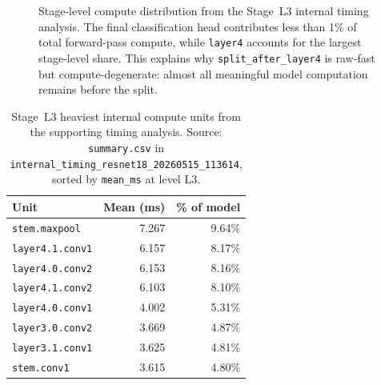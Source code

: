 \begin{figure}[t]
{%
}
\caption[Stage-level compute distribution (Stage~L3)]{Stage-level compute distribution from the Stage~L3 internal timing analysis. The final classification head contributes less than 1\% of total forward-pass compute, while \texttt{layer4} accounts for the largest stage-level share. This explains why \texttt{split\_after\_layer4} is raw-fast but compute-degenerate: almost all meaningful model computation remains before the split.}
\label{fig:rq13-stage-compute-distribution}
\end{figure}

\begin{table}[t]
\centering
\caption[Stage~L3 heaviest internal compute units]{Stage~L3 heaviest internal compute units from the supporting timing analysis. Source: \texttt{summary.csv} in \texttt{internal\_timing\_resnet18\_20260515\_113614}, sorted by \texttt{mean\_ms} at level L3.}
\label{tab:rq13-topops}
\begin{tabular}{lrr}
\toprule
\textbf{Unit} & \textbf{Mean (ms)} & \textbf{\% of model} \\
\midrule
\texttt{stem.maxpool}   & 7.267 & 9.64\% \\
\texttt{layer4.1.conv1} & 6.157 & 8.17\% \\
\texttt{layer4.0.conv2} & 6.153 & 8.16\% \\
\texttt{layer4.1.conv2} & 6.103 & 8.10\% \\
\texttt{layer4.0.conv1} & 4.002 & 5.31\% \\
\texttt{layer3.0.conv2} & 3.669 & 4.87\% \\
\texttt{layer3.1.conv1} & 3.625 & 4.81\% \\
\texttt{stem.conv1}     & 3.615 & 4.80\% \\
\bottomrule
\end{tabular}
\end{table}


